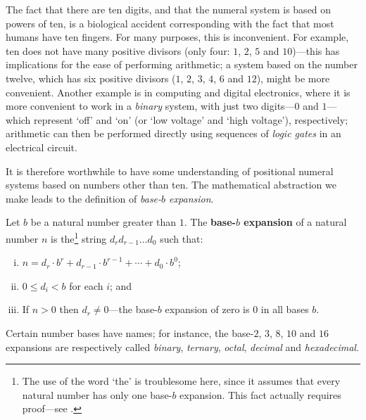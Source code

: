 The fact that there are ten digits, and that the numeral system is based on powers of ten, is a biological accident corresponding with the fact that most humans have ten fingers. For many purposes, this is inconvenient. For example, ten does not have many positive divisors (only four: $1$, $2$, $5$ and $10$)---this has implications for the ease of performing arithmetic; a system based on the number twelve, which has six positive divisors ($1$, $2$, $3$, $4$, $6$ and $12$), might be more convenient. Another example is in computing and digital electronics, where it is more convenient to work in a \textit{binary} system, with just two digits---$0$ and $1$---which represent `off' and `on' (or `low voltage' and `high voltage'), respectively; arithmetic can then be performed directly using sequences of \textit{logic gates} in an electrical circuit.

It is therefore worthwhile to have some understanding of positional numeral systems based on numbers other than ten. The mathematical abstraction we make leads to the definition of \textit{base-$b$ expansion}.

\begin{definition}
\label{defBaseBExpansionPreliminary}
Let $b$ be a natural number greater than $1$. The \textbf{base-$b$ expansion} of a natural number $n$ is the\footnote{The use of the word `the' is troublesome here, since it assumes that every natural number has only one base-$b$ expansion. This fact actually requires proof---see .} string $d_r d_{r-1} \dots d_0$ such that:
\begin{enumerate}[(i)]
\item $n = d_r \cdot b^r + d_{r-1} \cdot b^{r-1} + \cdots + d_0 \cdot b^0$;
\item $0 \le d_i < b$ for each $i$; and
\item If $n>0$ then $d_r \ne 0$---the base-$b$ expansion of zero is $0$ in all bases $b$.
\end{enumerate}
Certain number bases have names; for instance, the base-$2$, $3$, $8$, $10$ and $16$ expansions are respectively called \textit{binary}, \textit{ternary}, \textit{octal}, \textit{decimal} and \textit{hexadecimal}.
\end{definition}

